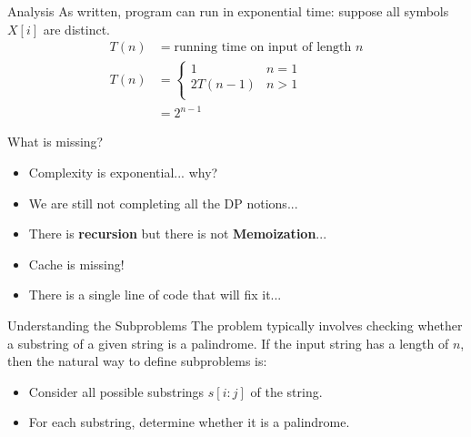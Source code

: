 \documentclass{beamer}
\begin{document}

\begin{frame}{Analysis}
    As written, program can run in exponential time: suppose all symbols $X[i]$ are distinct.
    \begin{equation*}
        \begin{align*}
            T(n) &= \text{running time on input of length } n \\
            T(n) &=
                    \begin{cases}
                        1         & n = 1 \\
                        2T(n - 1) & n > 1 \\
                    \end{cases} \\
                 &= 2^{n - 1}
        \end{align*}
    \end{equation*}
\end{frame}

\begin{frame}{What is missing?}
    \begin{itemize}
        \item Complexity is exponential... why? \pause
        \item We are still not completing all the DP notions...
        \item There is \textbf{recursion} but there is not \textbf{Memoization}... \pause
        \item Cache is missing!
        \item There is a single line of code that will fix it...
    \end{itemize}
\end{frame}

\begin{frame}{Understanding the Subproblems}
    The problem typically involves checking whether a substring of a given string is a palindrome. If the input string has a length of \( n \), then the natural way to define subproblems is:
    \begin{itemize}
        \item Consider all possible substrings $s[i:j]$ of the string.
        \item For each substring, determine whether it is a palindrome.
    \end{itemize}
\end{frame}
\end{document}
